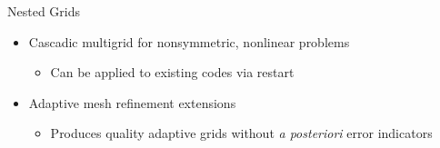 \documentclass[landscape,pdftex,headrule,footrule]{foils}
\begin{document}
                                                                                
\begin{foil}{Nested Grids}
  \begin{itemize}
    \item Cascadic multigrid for nonsymmetric, nonlinear problems
      \begin{itemize}
	\item Can be applied to existing codes via restart
      \end{itemize}
    \item Adaptive mesh refinement extensions
      \begin{itemize}
	\item Produces quality adaptive grids without \emph{a posteriori} error indicators
      \end{itemize}
  \end{itemize}
\end{foil}
\end{document}
